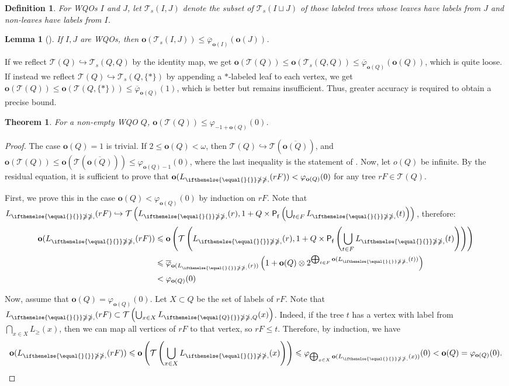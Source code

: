 \documentclass[10pt,a4paper]{amsart}
\let \leq \leqslant
\let \geq \geqslant
\let \ngeq \ngeqslant
\let \phi \varphi
\let \embeds \hookrightarrow
\renewcommand \L [2][]{L_{\ifthenelse{\equal{#1}{}}\ngeq{\ngeq,#1}}(#2)}
\renewcommand \l [2][]{\o(\L[#1]{#2})}
\renewcommand \S [1][]{\mathsf{P_f^{#1}}}
\def \T {\mathcal{T}}
\def \o {\textbf{o}}
\newtheorem{lemma}{Lemma}
\newtheorem{theorem}{Theorem}
\newtheorem{definition}{Definition}
\begin{document}
\begin{definition}
    For WQOs $I$ and $J$, let $\T_s(I, J)$ denote the subset of $\T_s(I \sqcup J)$ of those labeled trees whose leaves have labels from $J$ and non-leaves have labels from $I$.
\end{definition}

\begin{lemma}[{\cite[lemma 6.4]{Friedman2023}}]\label{o(T(I,J))}
    If $I,J$ are WQOs, then $\o(\T_s(I, J)) \leq \overline{\phi}_{\o(I)}(\o(J))$.
\end{lemma}

If we reflect $\T(Q) \embeds \T_s(Q, Q)$ by the identity map, we get $\o(\T(Q)) \leq \o(\T_s(Q, Q)) \leq \overline{\phi}_{\o(Q)}(\o(Q))$, which is quite loose. If instead we reflect $\T(Q) \embeds \T_s(Q, \{*\})$ by appending a $*$-labeled leaf to each vertex, we get $\o(\T(Q)) \leq \o(\T(Q, \{*\})) \leq \overline{\phi}_{\o(Q)}(1)$, which is better but remains insufficient. Thus, greater accuracy is required to obtain a precise bound.

\begin{theorem}
    For a non-empty WQO $Q$, $\o(\T(Q)) \leq \phi_{-1 + \o(Q)}(0)$.
\end{theorem}
\begin{proof}
    The case $\o(Q) = 1$ is trivial. If $2 \leq \o(Q) < \omega$, then $\T(Q) \embeds \T\left(\overline{\o(Q)}\right)$, and $\o(\T(Q)) \leq \o\left(\T\left(\overline{\o(Q)}\right)\right) \leq \phi_{\o(Q)-1}(0)$, where the last inequality is the statement of \cite[proposition 1]{Selivanov2025}. Now, let $o(Q)$ be infinite. By the residual equation, it is sufficient to prove that $\l{rF} < \phi_{\o(Q)}(0)$ for any tree $rF \in \T(Q)$.
    
    First, we prove this in the case $\o(Q) < \phi_{\o(Q)}(0)$ by induction on $rF$. Note that $\L{rF} \embeds \T\left(\L{r}, 1 + Q \times \S\left(\bigcup_{t \in F} \L{t}\right)\right)$, therefore:
    \begin{align*}
        \l{rF}
        &\leq \o\left(\T\left(\L{r}, 1 + Q \times \S\left(\bigcup_{t \in F} \L{t}\right)\right)\right)\\
        &\leq \overline{\phi}_{\l{r}}\left(1 + \o(Q) \otimes 2^{\bigoplus_{t \in F} \l{t}}\right)\\
        &< \phi_{\o(Q)}(0)
    \end{align*}
    
    Now, assume that $\o(Q) = \phi_{\o(Q)}(0)$. Let $X \subset Q$ be the set of labels of $rF$. Note that $\L{rF} \subset \T\left(\bigcup_{x \in X} \L[Q]{x}\right)$. Indeed, if the tree $t$ has a vertex with label from $\bigcap_{x \in X} L_\geq(x)$, then we can map all vertices of $rF$ to that vertex, so $rF \leq t$. Therefore, by induction, we have 
    $$\l{rF} \leq \o\left(\T\left(\bigcup_{x \in X} \L{x}\right)\right) \leq \phi_{\bigoplus_{x \in X} \l{x}}(0) < \o(Q) = \phi_{\o(Q)}(0).$$
\end{proof}
\end{document}
